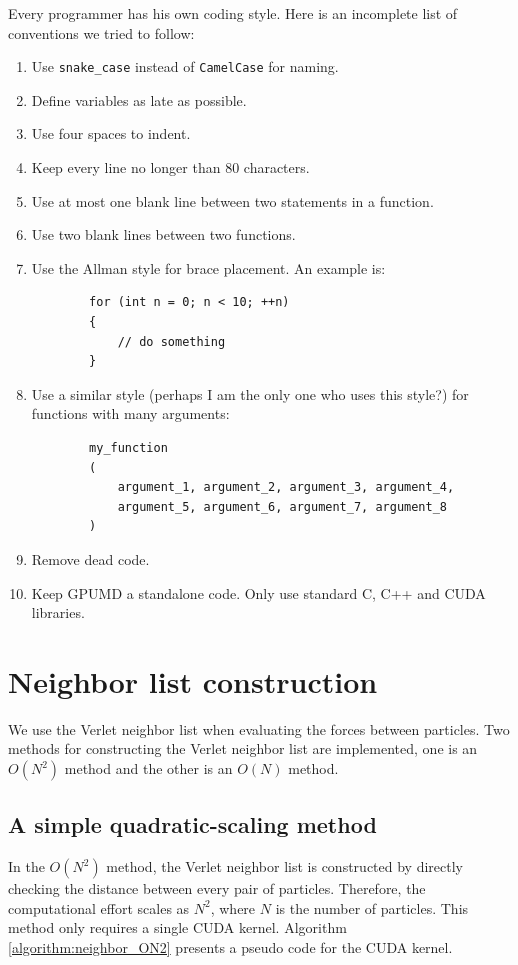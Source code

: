 \documentclass[12pt,a4paper]{report}
\begin{document}
Every programmer has his own coding style. Here is an incomplete list of conventions we tried to follow:
\begin{enumerate}
\item Use \verb"snake_case" instead of \verb"CamelCase" for naming.
\item Define variables as late as possible.
\item Use four spaces to indent. 
\item Keep every line no longer than 80 characters.
\item Use at most one blank line between two statements in a function.
\item Use two blank lines between two functions.
\item Use the Allman style for brace placement. An example is:
    \begin{verbatim}
        for (int n = 0; n < 10; ++n) 
        {
            // do something
        }
    \end{verbatim}
\item Use a similar style (perhaps I am the only one who uses this style?) for functions with many arguments:
    \begin{verbatim}
        my_function
        (
            argument_1, argument_2, argument_3, argument_4, 
            argument_5, argument_6, argument_7, argument_8
        )
    \end{verbatim}
\item Remove dead code.
\item Keep GPUMD a standalone code. Only use standard C, C++ and CUDA libraries.
\end{enumerate}


\section{Neighbor list construction}


We use the Verlet neighbor list when evaluating the forces between particles. Two methods for constructing the Verlet neighbor list are implemented, one is an $O(N^2)$ method and the other is an $O(N)$ method.


\subsection{A simple quadratic-scaling method}

In the $O(N^2)$ method, the Verlet neighbor list is constructed by directly checking the distance between every pair of particles. Therefore, the computational effort scales as $N^2$, where $N$ is the number of particles. This method only requires a single CUDA kernel.
Algorithm \ref{algorithm:neighbor_ON2} presents a pseudo code for the CUDA kernel.
\end{document}
